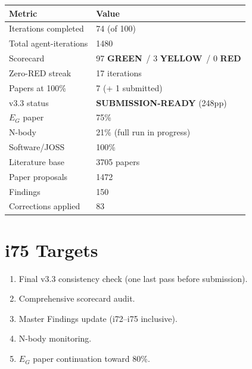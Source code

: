 \documentclass[11pt,a4paper]{article}
\newcommand{\GREEN}{\textcolor{dfdgreen}{\textbf{GREEN}}}
\newcommand{\YELLOW}{\textcolor{dfdyellow}{\textbf{YELLOW}}}
\newcommand{\RED}{\textcolor{dfdred}{\textbf{RED}}}
\begin{document}
\begin{center}
\begin{tabular}{ll}
\toprule
\textbf{Metric} & \textbf{Value} \\
\midrule
Iterations completed & 74 (of 100) \\
Total agent-iterations & 1480 \\
Scorecard & 97 \GREEN\ / 3 \YELLOW\ / 0 \RED \\
Zero-RED streak & 17 iterations \\
Papers at 100\% & 7 (+ 1 submitted) \\
v3.3 status & \textbf{SUBMISSION-READY} (248pp) \\
$E_G$ paper & 75\% \\
N-body & 21\% (full run in progress) \\
Software/JOSS & 100\% \\
Literature base & 3705 papers \\
Paper proposals & 1472 \\
Findings & 150 \\
Corrections applied & 83 \\
\bottomrule
\end{tabular}
\end{center}

\section{i75 Targets}

\begin{enumerate}[nosep]
\item Final v3.3 consistency check (one last pass before submission).
\item Comprehensive scorecard audit.
\item Master Findings update (i72--i75 inclusive).
\item N-body monitoring.
\item $E_G$ paper continuation toward 80\%.
\end{enumerate}
\end{document}
